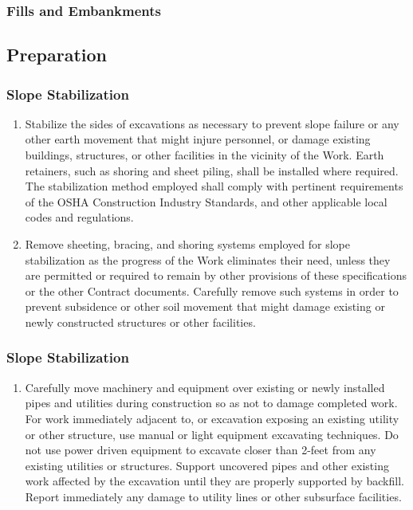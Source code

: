 \documentclass{article}%
\begin{document}
%
\subsubsection{Fills and Embankments}%
\label{ssubsec:FillsandEmbankments}%

%
\subsection{Preparation}%
\label{subsec:Preparation}%
\subsubsection{Slope Stabilization}%
\label{ssubsec:SlopeStabilization}%
\begin{enumerate}[label=\alph*),start=1]%
\item%
Stabilize the sides of excavations as necessary to prevent slope failure or any other earth movement that might injure personnel, or damage existing buildings, structures, or other facilities in the vicinity of the Work. Earth retainers, such as shoring and sheet piling, shall be installed where required. The stabilization method employed shall comply with pertinent requirements of the OSHA Construction Industry Standards, and other applicable local codes and regulations.%
\item%
Remove sheeting, bracing, and shoring systems employed for slope stabilization as the progress of the Work eliminates their need, unless they are permitted or required to remain by other provisions of these specifications or the other Contract documents. Carefully remove such systems in order to prevent subsidence or other soil movement that might damage existing or newly constructed structures or other facilities.%
\end{enumerate}

%
\subsubsection{Slope Stabilization}%
\label{ssubsec:SlopeStabilization}%
\begin{enumerate}[label=\alph*),start=1]%
\item%
Carefully move machinery and equipment over existing or newly installed pipes and utilities during construction so as not to damage completed work. For work immediately adjacent to, or excavation exposing an existing utility or other structure, use manual or light equipment excavating techniques. Do not use power driven equipment to excavate closer than 2{-}feet from any existing utilities or structures. Support uncovered pipes and other existing work affected by the excavation until they are properly supported by backfill. Report immediately any damage to utility lines or other subsurface facilities.%
\end{enumerate}
\end{document}
